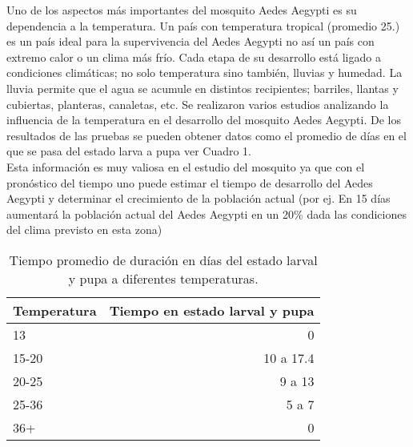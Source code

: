 Uno de los aspectos más importantes del mosquito Aedes Aegypti es su dependencia a la temperatura. Un país con temperatura tropical (promedio 25\textcelsius.) es un país ideal para la supervivencia del Aedes Aegypti no así un país con extremo calor o un clima más frío. Cada etapa de su desarrollo está ligado a condiciones climáticas; no solo temperatura sino también, lluvias y humedad. La lluvia permite que el agua se acumule en distintos recipientes; barriles, llantas y cubiertas, planteras, canaletas, etc. Se realizaron varios estudios analizando la influencia de la temperatura en el desarrollo del mosquito Aedes Aegypti. De los resultados de las pruebas se pueden obtener datos como el promedio de días en el que se pasa del estado larva a pupa ver Cuadro 1.\\

Esta información es muy valiosa en el estudio del mosquito ya que con el pronóstico del tiempo uno puede estimar el tiempo de desarrollo del Aedes Aegypti y determinar el crecimiento de la población actual (por ej. En 15 días aumentará la población actual del Aedes Aegypti en un 20\% dada las condiciones del clima previsto en esta zona)

\begin{table}
\centering
\begin{tabular}{l|r}
Temperatura & Tiempo en estado larval y pupa \\\hline
13 & 0 \\
15-20 & 10 a 17.4 \\
20-25 & 9 a 13 \\
25-36 & 5 a 7 \\
36+ & 0
\end{tabular}
\caption{\label{tab:widgets}Tiempo promedio de duración en días del estado larval y pupa a diferentes temperaturas.}
\end{table}
